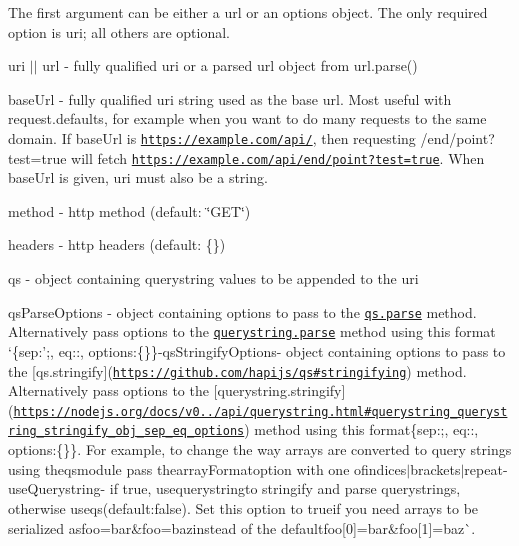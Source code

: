 The first argument can be either a {\ttfamily url} or an {\ttfamily options} object. The only required option is {\ttfamily uri}; all others are optional.


\begin{DoxyItemize}
\item {\ttfamily uri} $\vert$$\vert$ {\ttfamily url} -\/ fully qualified uri or a parsed url object from {\ttfamily url.\+parse()}
\item {\ttfamily base\+Url} -\/ fully qualified uri string used as the base url. Most useful with {\ttfamily request.\+defaults}, for example when you want to do many requests to the same domain. If {\ttfamily base\+Url} is {\ttfamily \href{https://example.com/api/}{\tt https\+://example.\+com/api/}}, then requesting {\ttfamily /end/point?test=true} will fetch {\ttfamily \href{https://example.com/api/end/point?test=true}{\tt https\+://example.\+com/api/end/point?test=true}}. When {\ttfamily base\+Url} is given, {\ttfamily uri} must also be a string.
\item {\ttfamily method} -\/ http method (default\+: {\ttfamily \char`\"{}\+G\+E\+T\char`\"{}})
\item {\ttfamily headers} -\/ http headers (default\+: {\ttfamily \{\}}) 


\item {\ttfamily qs} -\/ object containing querystring values to be appended to the {\ttfamily uri}
\item {\ttfamily qs\+Parse\+Options} -\/ object containing options to pass to the \href{https://github.com/hapijs/qs#parsing-objects}{\tt qs.\+parse} method. Alternatively pass options to the \href{https://nodejs.org/docs/v0.12.0/api/querystring.html#querystring_querystring_parse_str_sep_eq_options}{\tt querystring.\+parse} method using this format `\{sep\+:';\textquotesingle{}, eq\+:\textquotesingle{}\+:\textquotesingle{}, options\+:\{\}\}{\ttfamily  -\/}qs\+Stringify\+Options{\ttfamily -\/ object containing options to pass to the \mbox{[}qs.\+stringify\mbox{]}(\href{https://github.com/hapijs/qs#stringifying}{\tt https\+://github.\+com/hapijs/qs\#stringifying}) method. Alternatively pass options to the \mbox{[}querystring.\+stringify\mbox{]}(\href{https://nodejs.org/docs/v0.12.0/api/querystring.html#querystring_querystring_stringify_obj_sep_eq_options}{\tt https\+://nodejs.\+org/docs/v0../api/querystring.\+html\#querystring\+\_\+querystring\+\_\+stringify\+\_\+obj\+\_\+sep\+\_\+eq\+\_\+options}) method using this format}\{sep\+:\textquotesingle{};\textquotesingle{}, eq\+:\textquotesingle{}\+:\textquotesingle{}, options\+:\{\}\}{\ttfamily . For example, to change the way arrays are converted to query strings using the}qs{\ttfamily module pass the}array\+Format{\ttfamily option with one of}indices$\vert$brackets$\vert$repeat{\ttfamily  -\/}use\+Querystring{\ttfamily -\/ if true, use}querystring{\ttfamily to stringify and parse querystrings, otherwise use}qs{\ttfamily (default\+:}false{\ttfamily ). Set this option to }true{\ttfamily if you need arrays to be serialized as}foo=bar\&foo=baz{\ttfamily instead of the default}foo\mbox{[}0\mbox{]}=bar\&foo\mbox{[}1\mbox{]}=baz\`{}. 



\end{DoxyItemize}
